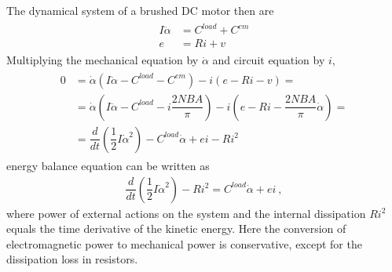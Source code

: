 \documentclass[letterpaper,10pt,english]{jupyterBook}
\begin{document}
\sphinxAtStartPar
The dynamical system of a brushed DC motor then are
\begin{equation*}
\begin{split}\begin{aligned}
  I \ddot{\alpha} & = C^{load} + C^{em} \\ 
               e  & = R i + v
\end{aligned}\end{split}
\end{equation*}
\sphinxAtStartPar
{} Multiplying the mechanical equation by \(\dot{\alpha}\) and circuit equation by \(i\),
\begin{equation*}
\begin{split}\begin{aligned}
  0 
  & = \dot{\alpha} \left( I \ddot{\alpha} - C^{load} - C^{em} \right) - i \left( e - R i - v \right) = \\
  & = \dot{\alpha} \left( I \ddot{\alpha} - C^{load} - i \dfrac{2 N BA}{\pi}  \right) - i \left( e - R i - \dfrac{2 N B A}{\pi} \dot{\alpha} \right) = \\
  & = \dfrac{d}{dt} \left( \dfrac{1}{2} I \dot{\alpha}^2 \right) - C^{load} \dot{\alpha} + e i - R i^2 
\end{aligned}\end{split}
\end{equation*}
\sphinxAtStartPar
energy balance equation can be written as
\begin{equation*}
\begin{split}
  \dfrac{d}{dt} \left( \dfrac{1}{2} I \dot{\alpha}^2 \right) - R i^2 =  C^{load} \dot{\alpha} + e i \ ,
\end{split}
\end{equation*}
\sphinxAtStartPar
where power of external actions on the system and the internal dissipation \(R i^2\) equals the time derivative of the kinetic energy. Here the conversion of electromagnetic power to mechanical power is conservative, except for the dissipation loss in resistors.
\end{document}
